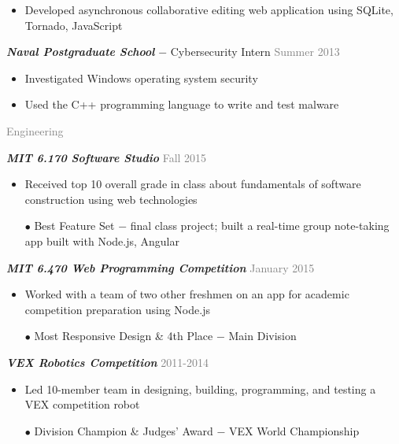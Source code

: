 \documentclass[11pt]{article}
\newcommand{\rsection}[1]{\vspace{1em}\textcolor{gray}{\Large \robotoslab #1}\vspace{0.5em}}
\newcommand{\bt}[1]{\textit{\textbf{#1}}} %
\newcommand{\gap}[0]{\vspace{0.5em}} %
\newcommand{\dash}[0]{ $-$ } %
\newcommand{\gray}[1]{\textcolor{gray}{#1}}
\begin{document}
\begin{itemize}
\item Developed asynchronous collaborative editing web application using SQLite, Tornado, JavaScript
\end{itemize}

\gap

\bt{Naval Postgraduate School}\dash Cybersecurity Intern \hfill \gray{Summer 2013}

\begin{itemize}
\item Investigated Windows operating system security
\item Used the C++ programming language to write and test malware
\end{itemize}

\rsection{Engineering}

\bt{MIT 6.170 Software Studio} \hfill \gray{Fall 2015}

\begin{itemize}
\item Received top 10 overall grade in class about fundamentals of software construction using web technologies
\item[$\bullet$] Best Feature Set\dash final class project; built a real-time group note-taking app built with Node.js, Angular
\end{itemize}

\gap

\bt{MIT 6.470 Web Programming Competition} \hfill \gray{January 2015}

\begin{itemize}
\item Worked with a team of two other freshmen on an app for academic competition preparation using Node.js
\item[$\bullet$] Most Responsive Design \& 4th Place\dash Main Division
\end{itemize}

\gap

\bt{VEX Robotics Competition} \hfill \gray{2011-2014}

\begin{itemize}
\item Led 10-member team in designing, building, programming, and testing a VEX competition robot
\item[$\bullet$] Division Champion \& Judges' Award\dash VEX World Championship
\end{itemize}

\gap
\end{document}
